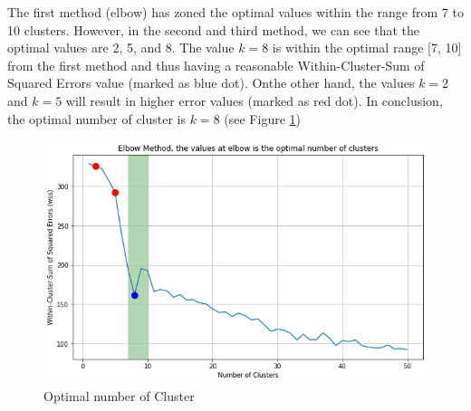 The first method (elbow) has zoned the optimal values within the range from 7 to 10 clusters.
However, in the second and third method, we can see that the optimal values are 2, 5, and 8.
The value $k=8$ is within the optimal range [7, 10] from the first method and thus having a reasonable Within-Cluster-Sum of Squared Errors value (marked as blue dot).
Onthe other hand, the values $k=2$ and $k=5$ will result in higher error values (marked as red dot).
In conclusion, the optimal number of cluster is $k=8$ (see Figure \ref{Fig: Optimal})

\begin{figure}
    \includegraphics[width=\textwidth]{Appendices/optimalCluster.png}
    \caption{Optimal number of Cluster}
    \label{Fig: Optimal}
\end{figure}
